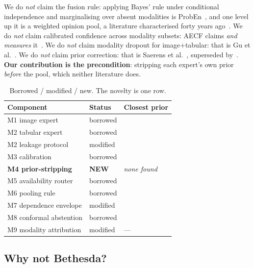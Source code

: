 \documentclass[sigplan,nonacm,screen]{acmart}
\begin{document}
\begin{keybox}
We do \emph{not} claim the fusion rule: applying Bayes' rule under conditional independence and marginalising over absent modalities is ProbEn~\cite{chen2022proben}, and one level up it is a weighted opinion pool, a literature characterised forty years ago~\cite{genest1986combining}. We do \emph{not} claim calibrated confidence across modality subsets: AECF claims \emph{and measures} it~\cite{chlon2025aecf}. We do \emph{not} claim modality dropout for image$+$tabular: that is Gu et al.~\cite{gu2025modality}. We do \emph{not} claim prior correction: that is Saerens et al.~\cite{saerens2002adjusting}, superseded by~\cite{alexandari2020maximum}. \textbf{Our contribution is the precondition}: stripping each expert's own prior \emph{before} the pool, which neither literature does.
\end{keybox}

\begin{table}[t]
\caption{Borrowed / modified / new. The novelty is one row.}
\label{tab:novelty}
\footnotesize
\setlength{\tabcolsep}{4pt}
\begin{tabular}{@{}llp{2.3cm}@{}}
\toprule
\textbf{Component} & \textbf{Status} & \textbf{Closest prior} \\
\midrule
M1 image expert & borrowed & \cite{tan2019efficientnet,plissiti2018sipakmed} \\
M2 tabular expert & borrowed & \cite{grinsztajn2022why} \\
M2 leakage protocol & modified & \cite{fernandes2018supervised} \\
M3 calibration & borrowed & \cite{guo2017calibration,alexandari2020maximum} \\
\textbf{M4 prior-stripping} & \textbf{NEW} & \emph{none found} \\
M5 availability router & borrowed & \cite{chen2022proben} \\
M6 pooling rule & borrowed & \cite{kittler1998combining,genest1986combining} \\
M7 dependence envelope & modified & \cite{grill2017comparison} \\
M8 conformal abstention & borrowed & \cite{angelopoulos2021gentle} \\
M9 modality attribution & modified & --- \\
\bottomrule
\end{tabular}
\end{table}

\subsection{Why not Bethesda?}
\label{sec:bethesda}
\end{document}
